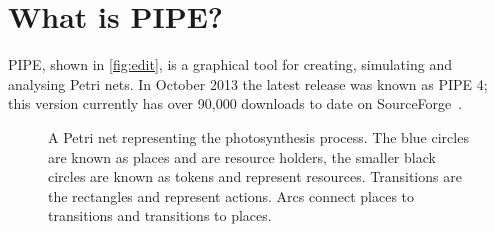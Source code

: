 \section{What is PIPE?}
PIPE, shown in \cref{fig:edit}, is a graphical tool for creating, simulating and analysing Petri nets. In October 2013 the latest release was known as PIPE 4; this version currently has over 90,000 downloads to date on SourceForge~\cite{downloads}. 


\begin{figure}[H]

\caption{A Petri net representing the photosynthesis process. The blue circles are known as places and are resource holders, the smaller black circles are known as tokens and represent resources. Transitions are the rectangles and represent actions. Arcs connect places to transitions and transitions to places.}
\label{tikz:photo}
\end{figure}

